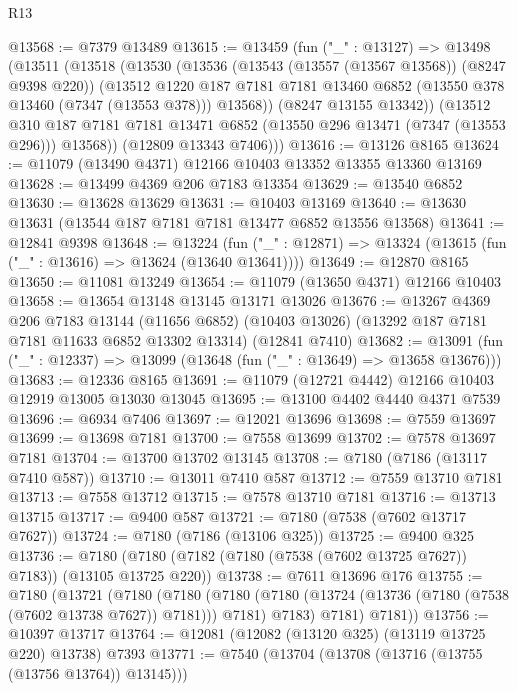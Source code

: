 \begin{lexlean}{R13}
\begin{coremodule}
@13568 := @7379 @13489
@13615 := @13459
    (fun ("_" : @13127) =>
    @13498
      (@13511
        (@13518
          (@13530
            (@13536
              (@13543 (@13557 (@13567 @13568)) (@8247 @9398 @220))
              (@13512
                @1220
                @187
                @7181
                @7181
                @13460
                @6852
                (@13550 @378 @13460 (@7347 (@13553 @378)))
                @13568))
            (@8247 @13155 @13342))
          (@13512
            @310
            @187
            @7181
            @7181
            @13471
            @6852
            (@13550 @296 @13471 (@7347 (@13553 @296)))
            @13568))
        (@12809 @13343 @7406)))
@13616 := @13126 @8165
@13624 := @11079 (@13490 @4371) @12166 @10403 @13352 @13355 @13360 @13169
@13628 := @13499 @4369 @206 @7183 @13354
@13629 := @13540 @6852
@13630 := @13628 @13629
@13631 := @10403 @13169
@13640 := @13630 @13631 (@13544 @187 @7181 @7181 @13477 @6852 @13556 @13568)
@13641 := @12841 @9398
@13648 := @13224
    (fun ("_" : @12871) => @13324 (@13615 (fun ("_" : @13616) => @13624 (@13640 @13641))))
@13649 := @12870 @8165
@13650 := @11081 @13249
@13654 := @11079 (@13650 @4371) @12166 @10403
@13658 := @13654 @13148 @13145 @13171 @13026
@13676 := @13267
    @4369
    @206
    @7183
    @13144
    (@11656 @6852)
    (@10403 @13026)
    (@13292 @187 @7181 @7181 @11633 @6852 @13302 @13314)
    (@12841 @7410)
@13682 := @13091 (fun ("_" : @12337) => @13099 (@13648 (fun ("_" : @13649) => @13658 @13676)))
@13683 := @12336 @8165
@13691 := @11079 (@12721 @4442) @12166 @10403 @12919 @13005 @13030 @13045
@13695 := @13100 @4402 @4440 @4371 @7539
@13696 := @6934 @7406
@13697 := @12021 @13696
@13698 := @7559 @13697
@13699 := @13698 @7181
@13700 := @7558 @13699
@13702 := @7578 @13697 @7181
@13704 := @13700 @13702 @13145
@13708 := @7180 (@7186 (@13117 @7410 @587))
@13710 := @13011 @7410 @587
@13712 := @7559 @13710 @7181
@13713 := @7558 @13712
@13715 := @7578 @13710 @7181
@13716 := @13713 @13715
@13717 := @9400 @587
@13721 := @7180 (@7538 (@7602 @13717 @7627))
@13724 := @7180 (@7186 (@13106 @325))
@13725 := @9400 @325
@13736 := @7180 (@7180 (@7182 (@7180 (@7538 (@7602 @13725 @7627)) @7183)) (@13105 @13725 @220))
@13738 := @7611 @13696 @176
@13755 := @7180
    (@13721
      (@7180
        (@7180
          (@7180 (@7180 (@13724 (@13736 (@7180 (@7538 (@7602 @13738 @7627)) @7181))) @7181) @7183)
          @7181)
        @7181))
@13756 := @10397 @13717
@13764 := @12081 (@12082 (@13120 @325) (@13119 @13725 @220) @13738) @7393
@13771 := @7540 (@13704 (@13708 (@13716 (@13755 (@13756 @13764)) @13145)))

\end{coremodule}
\end{lexlean}
